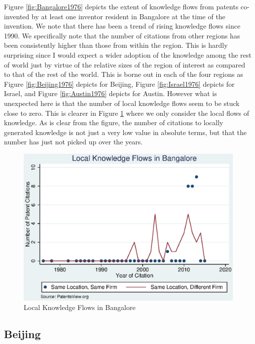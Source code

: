 \documentclass[12pt]{article}
\begin{document}
Figure \ref{fig:Bangalore1976} depicts the extent of knowledge flows from patents co-invented by at least one inventor resident in Bangalore at the time of the invention. We note that there has been a trend of rising knowledge flows since 1990. We specifically note that the number of citations from other regions has been consistently higher than those from within the region. This is hardly surprising since I would expect a wider adoption of the knowledge among the rest of world just by virtue of the relative sizes of the region of interest as compared to that of the rest of the world. This is borne out in each of the four regions as Figure \ref{fig:Beijing1976} depicts for Beijing, Figure \ref{fig:Israel1976} depicts for Israel, and Figure \ref{fig:Austin1976} depicts for Austin. However what is unexpected here is that the number of local knowledge flows seem to be stuck close to zero. This is clearer in Figure \ref{fig:BangaloreLocal1976} where we only consider the local flows of knowledge. As is clear from the figure, the number of citations to locally generated knowledge is not just a very low value in absolute terms, but that the number has just not picked up over the years.

\begin{figure}[h]
\begin{centering}
  \includegraphics[width=\textwidth]{BangaloreLocal1976}
  \caption{Local Knowledge Flows in Bangalore}
  \label{fig:BangaloreLocal1976}
\end{centering}
\end{figure}


\subsection{Beijing}
\end{document}
